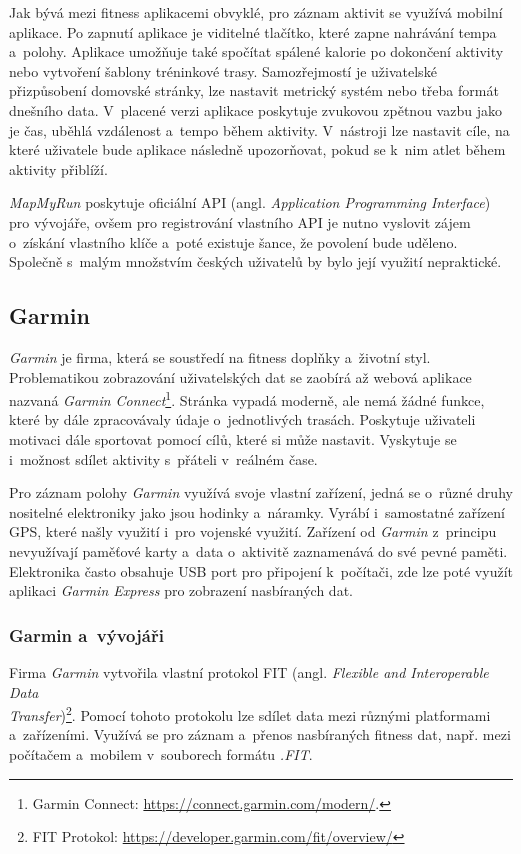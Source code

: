 Jak bývá mezi fitness aplikacemi obvyklé, pro záznam aktivit se využívá mobilní aplikace. Po zapnutí aplikace je viditelné  tlačítko, které zapne nahrávání tempa a~polohy. Aplikace umožňuje také spočítat spálené kalorie po dokončení aktivity nebo vytvoření šablony tréninkové trasy. Samozřejmostí je uživatelské přizpůsobení domovské stránky, lze nastavit metrický systém nebo třeba formát dnešního data. V~placené verzi aplikace poskytuje zvukovou zpětnou vazbu jako je čas, uběhlá vzdálenost a~tempo během aktivity. V~nástroji lze nastavit cíle, na které uživatele bude aplikace následně upozorňovat, pokud se k~nim atlet během aktivity přiblíží. \cite{stravavsmapmyrun,mapmyrun} 

\emph{MapMyRun} poskytuje oficiální API (angl. \emph{Application Programming Interface}) pro vývojáře, ovšem pro registrování vlastního API je nutno vyslovit zájem o~získání vlastního klíče a~poté existuje šance, že povolení bude uděleno. Společně s~malým množstvím českých uživatelů by bylo její využití nepraktické.
\subsection{Garmin}
\emph{Garmin} je firma, která se soustředí na fitness doplňky a~životní styl. Problematikou zobrazování uživatelských dat se zaobírá až webová aplikace nazvaná \emph{Garmin Connect}\footnote{Garmin Connect: \url{https://connect.garmin.com/modern/}.}. Stránka vypadá moderně, ale nemá žádné funkce, které by dále zpracovávaly údaje o~jednotlivých trasách. Poskytuje uživateli motivaci dále sportovat pomocí cílů, které si může nastavit. Vyskytuje se i~možnost sdílet aktivity s~přáteli v~reálném čase. 

Pro záznam polohy \emph{Garmin} využívá svoje vlastní zařízení, jedná se o~různé druhy nositelné elektroniky jako jsou hodinky a~náramky. Vyrábí i~samostatné zařízení GPS, které našly využití i~pro vojenské využití. Zařízení od \emph{Garmin} z~principu nevyužívají paměťové karty a~data o~aktivitě zaznamenává do své pevné paměti. Elektronika často obsahuje USB port pro připojení k~počítači, zde lze poté využít aplikaci \emph{Garmin Express} pro zobrazení nasbíraných dat.~\cite{garmin} 

\subsubsection{Garmin a~vývojáři}
Firma \emph{Garmin} vytvořila vlastní protokol FIT (angl. \emph{Flexible and Interoperable Data}\\\emph{Transfer})\footnote{FIT Protokol: \url{https://developer.garmin.com/fit/overview/}}. Pomocí tohoto protokolu lze sdílet data mezi různými platformami a~zařízeními. Využívá se pro záznam a~přenos nasbíraných fitness dat, např. mezi počítačem a~mobilem v~souborech formátu \emph{.FIT}.~\cite{garminfit} 

